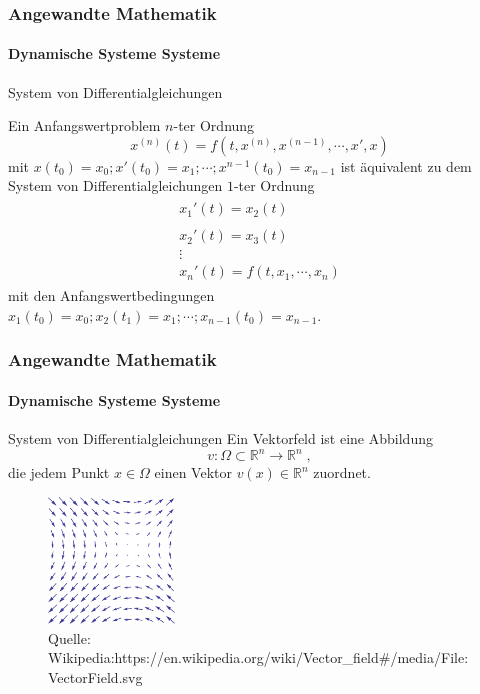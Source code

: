 \documentclass{beamer}
\begin{document}
\begin{frame}
    \frametitle{Angewandte Mathematik}
\framesubtitle{Dynamische Systeme Systeme}
\begin{block}{System von Differentialgleichungen}

Ein Anfangswertproblem $n$-ter Ordnung
 $$ x^{(n)}(t) = f(t, x^{(n)}, x^{(n-1)} , \cdots , x', x) $$ mit  $x(t_0) = x_0 ; x'(t_0) = x_1; \cdots ; x^{n-1}(t_{0})= x_{n-1}  $ ist äquivalent zu dem System von   Differentialgleichungen $1$-ter Ordnung
\begin{align*}
\begin{matrix} x_1'(t) = x_2(t) \\  \\ x_2'(t) = x_3(t) \\  \vdots  \\ x_n'(t) = f(t, x_1, \cdots, x_n )\end{matrix}
\end{align*}
mit den Anfangswertbedingungen  $x_1(t_0) = x_0 ; x_2(t_1) = x_1; \cdots ; x_{n-1}(t_{0})= x_{n-1} $.
\end{block}
 \end{frame}


\begin{frame}
    \frametitle{Angewandte Mathematik}
\framesubtitle{Dynamische Systeme Systeme}
\begin{block}{System von Differentialgleichungen}
Ein Vektorfeld ist eine Abbildung $$v : \Omega \subset \mathbb{R}^n \to \mathbb{R}^n \; ,$$ die jedem Punkt $x  \in \Omega$ einen Vektor $v(x) \in \mathbb{R}^n$ zuordnet.
\end{block}
\begin{figure}[H]
      \centering
    \includegraphics[width=0.3\textwidth]{images/480px-VectorField.png}
\caption{Quelle: Wikipedia:https://en.wikipedia.org/wiki/Vector\_field\#/media/File:VectorField.svg}
\end{figure}

 \end{frame}
\end{document}
